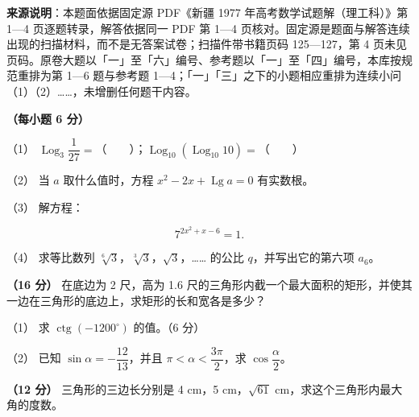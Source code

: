


\begin{gktip}
\textbf{来源说明}：本题面依据固定源 PDF《新疆 1977 年高考数学试题解（理工科）》第 1—4 页逐题转录，解答依据同一 PDF 第 1—4 页核对。固定源是题面与解答连续出现的扫描材料，而不是无答案试卷；扫描件带书籍页码 125—127，第 4 页未见页码。原卷大题以「一」至「六」编号、参考题以「一」至「四」编号，本库按规范重排为第 1—6 题与参考题 1—4；「一」「三」之下的小题相应重排为连续小问（1）（2）……，未增删任何题干内容。
\end{gktip}

\begin{question}
\textbf{（每小题 6 分）} 

（1） $\operatorname{Log}_3\dfrac{1}{27}=$\mbox{（　　）}；$\operatorname{Log}_{10}(\operatorname{Log}_{10}10)=$\mbox{（　　）}

（2） 当 $a$ 取什么值时，方程 $x^2-2x+\operatorname{Lg}a=0$ 有实数根。

（3） 解方程：

\nopagebreak[4]
\[
7^{2x^2+x-6}=1.
\]

（4） 求等比数列 $\sqrt[6]{3}$，$\sqrt[3]{3}$，$\sqrt{3}$，…… 的公比 $q$，并写出它的第六项 $a_6$。

\Needspace{0.4\textheight}
\end{question}
\begin{question}
\textbf{（16 分）} 在底边为 2 尺，高为 1.6 尺的三角形内截一个最大面积的矩形，并使其一边在三角形的底边上，求矩形的长和宽各是多少？
\nopagebreak[4]
\begin{center}\end{center}
\nopagebreak[4]
\end{question}
\begin{question}

（1） 求 $\operatorname{ctg}(-1200^\circ)$ 的值。（6 分）

（2） 已知 $\sin\alpha=-\dfrac{12}{13}$，并且 $\pi<\alpha<\dfrac{3\pi}{2}$，求 $\cos\dfrac{\alpha}{2}$。

\end{question}
\begin{question}
\textbf{（12 分）} 三角形的三边长分别是 4 cm，5 cm，$\sqrt{61}$ cm，求这个三角形内最大角的度数。

\end{question}
